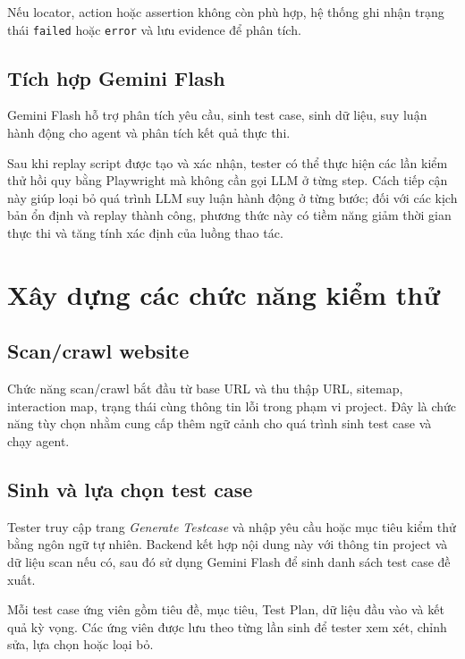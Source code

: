 Nếu locator, action hoặc assertion không còn phù hợp, hệ thống ghi nhận trạng thái \texttt{failed} hoặc \texttt{error} và lưu evidence để phân tích.

\subsection{Tích hợp Gemini Flash}

Gemini Flash hỗ trợ phân tích yêu cầu, sinh test case, sinh dữ liệu, suy luận hành động cho agent và phân tích kết quả thực thi.

Sau khi replay script được tạo và xác nhận, tester có thể thực hiện các lần kiểm thử hồi quy bằng Playwright mà không cần gọi LLM ở từng step. Cách tiếp cận này giúp loại bỏ quá trình LLM suy luận hành động ở từng bước; đối với các kịch bản ổn định và replay thành công, phương thức này có tiềm năng giảm thời gian thực thi và tăng tính xác định của luồng thao tác.

\section{Xây dựng các chức năng kiểm thử}

\subsection{Scan/crawl website}

Chức năng scan/crawl bắt đầu từ base URL và thu thập URL, sitemap, interaction map, trạng thái cùng thông tin lỗi trong phạm vi project. Đây là chức năng tùy chọn nhằm cung cấp thêm ngữ cảnh cho quá trình sinh test case và chạy agent.

\subsection{Sinh và lựa chọn test case}

Tester truy cập trang \textit{Generate Testcase} và nhập yêu cầu hoặc mục tiêu kiểm thử bằng ngôn ngữ tự nhiên. Backend kết hợp nội dung này với thông tin project và dữ liệu scan nếu có, sau đó sử dụng Gemini Flash để sinh danh sách test case đề xuất.

Mỗi test case ứng viên gồm tiêu đề, mục tiêu, Test Plan, dữ liệu đầu vào và kết quả kỳ vọng. Các ứng viên được lưu theo từng lần sinh để tester xem xét, chỉnh sửa, lựa chọn hoặc loại bỏ.

